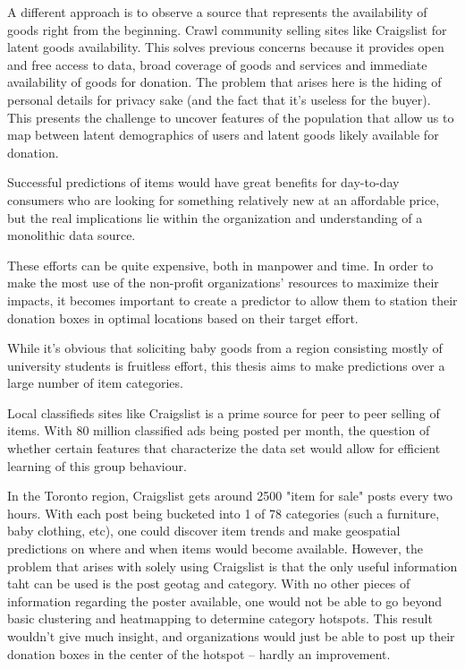 \documentclass[12pt]{article}
\begin{document}
A different approach is to observe a source that represents the availability of goods right from the beginning. Crawl community selling sites like Craigslist for latent goods availability. This solves previous concerns because it provides open and free access to data, broad coverage of goods and services and immediate availability of goods for donation. The problem that arises here is the hiding of personal details for privacy sake (and the fact that it's useless for the buyer). This presents the challenge to uncover features of the population that allow us to map between latent demographics of users and latent goods likely available for donation. 

Successful predictions of items would have great benefits for day-to-day consumers who are looking for something relatively new at an affordable price, but the real implications lie within the organization and understanding of a monolithic data source.

These efforts can be quite expensive, both in manpower and time. In order to make the most use of the non-profit organizations' resources to maximize their impacts, it becomes important to create a predictor to allow them to station their donation boxes in optimal locations based on their target effort. 

While it's obvious that soliciting baby goods from a region consisting mostly of university students is fruitless effort, this thesis aims to make predictions over a large number of item categories. 

Local classifieds sites like Craigslist is a prime source for peer to peer selling of items. With 80 million classified ads being posted per month\cite{clfs}, the question of whether certain features that characterize the data set would allow for efficient learning of this group behaviour. 

In the Toronto region, Craigslist gets around 2500 "item for sale" posts every two hours. With each post being bucketed into 1 of 78 categories (such a furniture, baby clothing, etc), one could discover item trends and make geospatial predictions on where and when items would become available. However, the problem that arises with solely using Craigslist is that the only useful information taht can be used is the post geotag and category. With no other pieces of information regarding the poster available, one would not be able to go beyond basic clustering and heatmapping to determine category hotspots. This result wouldn't give much insight, and organizations would just be able to post up their donation boxes in the center of the hotspot -- hardly an improvement. 
\end{document}
